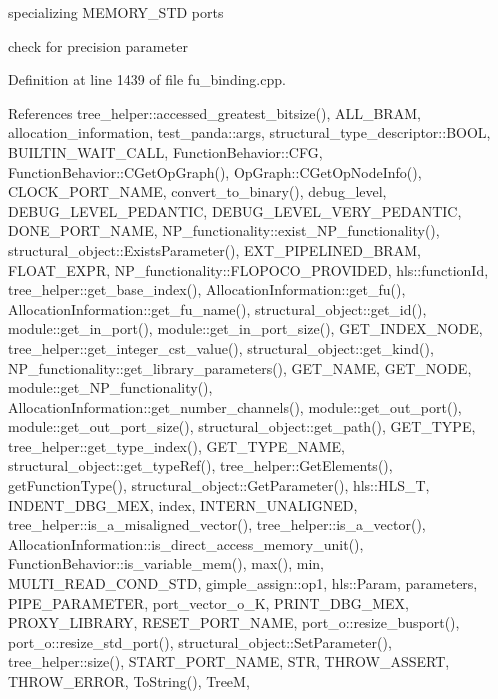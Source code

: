 specializing M\+E\+M\+O\+R\+Y\+\_\+\+S\+TD ports

check for precision parameter 

Definition at line 1439 of file fu\+\_\+binding.\+cpp.



References tree\+\_\+helper\+::accessed\+\_\+greatest\+\_\+bitsize(), A\+L\+L\+\_\+\+B\+R\+AM, allocation\+\_\+information, test\+\_\+panda\+::args, structural\+\_\+type\+\_\+descriptor\+::\+B\+O\+OL, B\+U\+I\+L\+T\+I\+N\+\_\+\+W\+A\+I\+T\+\_\+\+C\+A\+LL, Function\+Behavior\+::\+C\+FG, Function\+Behavior\+::\+C\+Get\+Op\+Graph(), Op\+Graph\+::\+C\+Get\+Op\+Node\+Info(), C\+L\+O\+C\+K\+\_\+\+P\+O\+R\+T\+\_\+\+N\+A\+ME, convert\+\_\+to\+\_\+binary(), debug\+\_\+level, D\+E\+B\+U\+G\+\_\+\+L\+E\+V\+E\+L\+\_\+\+P\+E\+D\+A\+N\+T\+IC, D\+E\+B\+U\+G\+\_\+\+L\+E\+V\+E\+L\+\_\+\+V\+E\+R\+Y\+\_\+\+P\+E\+D\+A\+N\+T\+IC, D\+O\+N\+E\+\_\+\+P\+O\+R\+T\+\_\+\+N\+A\+ME, N\+P\+\_\+functionality\+::exist\+\_\+\+N\+P\+\_\+functionality(), structural\+\_\+object\+::\+Exists\+Parameter(), E\+X\+T\+\_\+\+P\+I\+P\+E\+L\+I\+N\+E\+D\+\_\+\+B\+R\+AM, F\+L\+O\+A\+T\+\_\+\+E\+X\+PR, N\+P\+\_\+functionality\+::\+F\+L\+O\+P\+O\+C\+O\+\_\+\+P\+R\+O\+V\+I\+D\+ED, hls\+::function\+Id, tree\+\_\+helper\+::get\+\_\+base\+\_\+index(), Allocation\+Information\+::get\+\_\+fu(), Allocation\+Information\+::get\+\_\+fu\+\_\+name(), structural\+\_\+object\+::get\+\_\+id(), module\+::get\+\_\+in\+\_\+port(), module\+::get\+\_\+in\+\_\+port\+\_\+size(), G\+E\+T\+\_\+\+I\+N\+D\+E\+X\+\_\+\+N\+O\+DE, tree\+\_\+helper\+::get\+\_\+integer\+\_\+cst\+\_\+value(), structural\+\_\+object\+::get\+\_\+kind(), N\+P\+\_\+functionality\+::get\+\_\+library\+\_\+parameters(), G\+E\+T\+\_\+\+N\+A\+ME, G\+E\+T\+\_\+\+N\+O\+DE, module\+::get\+\_\+\+N\+P\+\_\+functionality(), Allocation\+Information\+::get\+\_\+number\+\_\+channels(), module\+::get\+\_\+out\+\_\+port(), module\+::get\+\_\+out\+\_\+port\+\_\+size(), structural\+\_\+object\+::get\+\_\+path(), G\+E\+T\+\_\+\+T\+Y\+PE, tree\+\_\+helper\+::get\+\_\+type\+\_\+index(), G\+E\+T\+\_\+\+T\+Y\+P\+E\+\_\+\+N\+A\+ME, structural\+\_\+object\+::get\+\_\+type\+Ref(), tree\+\_\+helper\+::\+Get\+Elements(), get\+Function\+Type(), structural\+\_\+object\+::\+Get\+Parameter(), hls\+::\+H\+L\+S\+\_\+T, I\+N\+D\+E\+N\+T\+\_\+\+D\+B\+G\+\_\+\+M\+EX, index, I\+N\+T\+E\+R\+N\+\_\+\+U\+N\+A\+L\+I\+G\+N\+ED, tree\+\_\+helper\+::is\+\_\+a\+\_\+misaligned\+\_\+vector(), tree\+\_\+helper\+::is\+\_\+a\+\_\+vector(), Allocation\+Information\+::is\+\_\+direct\+\_\+access\+\_\+memory\+\_\+unit(), Function\+Behavior\+::is\+\_\+variable\+\_\+mem(), max(), min, M\+U\+L\+T\+I\+\_\+\+R\+E\+A\+D\+\_\+\+C\+O\+N\+D\+\_\+\+S\+TD, gimple\+\_\+assign\+::op1, hls\+::\+Param, parameters, P\+I\+P\+E\+\_\+\+P\+A\+R\+A\+M\+E\+T\+ER, port\+\_\+vector\+\_\+o\+\_\+K, P\+R\+I\+N\+T\+\_\+\+D\+B\+G\+\_\+\+M\+EX, P\+R\+O\+X\+Y\+\_\+\+L\+I\+B\+R\+A\+RY, R\+E\+S\+E\+T\+\_\+\+P\+O\+R\+T\+\_\+\+N\+A\+ME, port\+\_\+o\+::resize\+\_\+busport(), port\+\_\+o\+::resize\+\_\+std\+\_\+port(), structural\+\_\+object\+::\+Set\+Parameter(), tree\+\_\+helper\+::size(), S\+T\+A\+R\+T\+\_\+\+P\+O\+R\+T\+\_\+\+N\+A\+ME, S\+TR, T\+H\+R\+O\+W\+\_\+\+A\+S\+S\+E\+RT, T\+H\+R\+O\+W\+\_\+\+E\+R\+R\+OR, To\+String(), TreeM, 